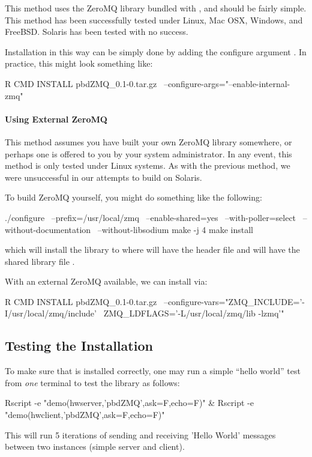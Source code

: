 This method uses the ZeroMQ library bundled with , and should be 
fairly simple.  This method has been successfully tested under Linux, Mac OSX, 
Windows, and FreeBSD. Solaris has been tested with no success.

Installation in this way can be simply done by adding the configure argument 
.  In practice, this might look something like:
\begin{Command}
R CMD INSTALL pbdZMQ_0.1-0.tar.gz \
  --configure-args="--enable-internal-zmq"
\end{Command}


\paragraph{Using External ZeroMQ}

This method assumes you have built your own ZeroMQ library somewhere, or 
perhaps one is offered to you by your system administrator.  In any event, 
this method is only tested under Linux systems.  As with the previous method, 
we were unsuccessful in our attempts to build on Solaris.

To build ZeroMQ yourself, you might do something like the following:
\begin{Command}
./configure \
   --prefix=/usr/local/zmq \
   --enable-shared=yes \
   --with-poller=select \
   --without-documentation \
   --without-libsodium
make -j 4
make install
\end{Command}
which will install the library to  where
 will have the header file  and
 will have the shared library file .

With an external ZeroMQ available, we can install  via:
\begin{Command}
R CMD INSTALL pbdZMQ_0.1-0.tar.gz \
  --configure-vars="ZMQ_INCLUDE='-I/usr/local/zmq/include' \
                    ZMQ_LDFLAGS='-L/usr/local/zmq/lib -lzmq'"
\end{Command}



\subsection{Testing the Installation}

To make sure that \pkg{pbdZMQ} is installed correctly, one may run a simple 
``hello world'' test from {\em one} terminal to test the library as follows:
\begin{Command}
Rscript -e "demo(hwserver,'pbdZMQ',ask=F,echo=F)" &
Rscript -e "demo(hwclient,'pbdZMQ',ask=F,echo=F)"
\end{Command}
This will run 5 iterations of sending and receiving 'Hello World' messages 
between two instances (simple server and client).



